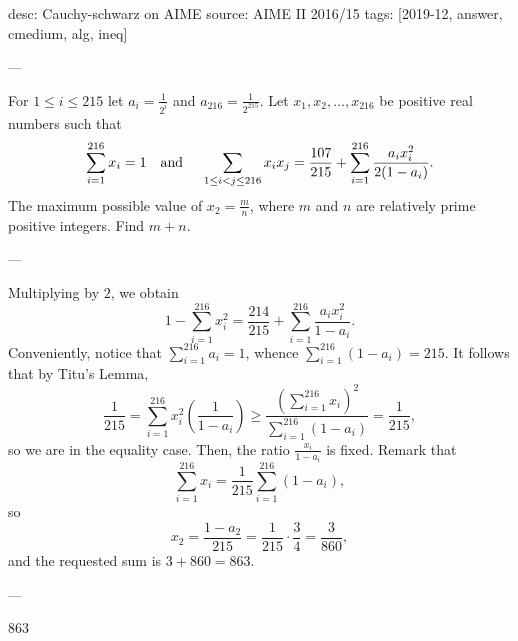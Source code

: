 desc: Cauchy-schwarz on AIME
source: AIME II 2016/15
tags: [2019-12, answer, cmedium, alg, ineq]

---

For $1\leq i\leq 215$ let $a_i=\frac{1}{2^i}$ and $a_{216}=\frac{1}{2^{215}}$. Let $x_1,x_2,\ldots,x_{216}$ be positive real numbers such that \[ \sum\limits_{i=1}^{216} x_i=1 \text{\quad and \quad} \sum\limits_{1\leq i<j \leq 216} x_ix_j = \frac{107}{215}+ \sum\limits_{i=1}^{216} \frac{a_ix_i^2}{2(1-a_i)}.\]The maximum possible value of $x_2=\frac{m}{n}$, where $m$ and $n$ are relatively prime positive integers. Find $m+n$.

---

Multiplying by $2$, we obtain \[1-\sum_{i=1}^{216}x_i^2=\frac{214}{215}+\sum_{i=1}^{216}\frac{a_ix_i^2}{1-a_i}.\]
Conveniently, notice that $\sum_{i=1}^{216}a_i=1$, whence $\sum_{i=1}^{216}(1-a_i)=215$. It follows that by Titu's Lemma, \[\frac1{215}=\sum_{i=1}^{216}x_i^2\left(\frac1{1-a_i}\right)\ge\frac{\left(\displaystyle\sum_{i=1}^{216}x_i\right)^2}{\displaystyle\sum_{i=1}^{216}(1-a_i)}=\frac1{215},\]
so we are in the equality case. Then, the ratio $\frac{x_i}{1-a_i}$ is fixed. Remark that \[\sum_{i=1}^{216}x_i=\frac1{215}\sum_{i=1}^{216}(1-a_i),\]
so \[x_2=\frac{1-a_2}{215}=\frac1{215}\cdot\frac34=\frac3{860},\]
and the requested sum is $3+860=863$.

---

863
